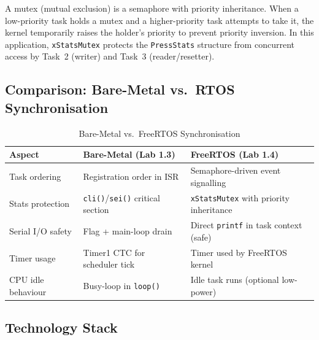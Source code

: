 \documentclass[12pt]{article}
\begin{document}
A mutex (mutual exclusion) is a semaphore with priority inheritance. When a low-priority task holds a mutex and a higher-priority task attempts to take it, the kernel temporarily raises the holder's priority to prevent priority inversion. In this application, \texttt{xStatsMutex} protects the \texttt{PressStats} structure from concurrent access by Task~2 (writer) and Task~3 (reader/resetter). \cite{freertos_mutex}

\subsection{Comparison: Bare-Metal vs.\ RTOS Synchronisation}

\begin{table}[H]
\centering
\begin{tabular}{@{}p{3.5cm}p{4.8cm}p{4.8cm}@{}}
\toprule
\textbf{Aspect} & \textbf{Bare-Metal (Lab 1.3)} & \textbf{FreeRTOS (Lab 1.4)} \\
\midrule
Task ordering       & Registration order in ISR     & Semaphore-driven event signalling \\
Stats protection    & \texttt{cli()}/\texttt{sei()} critical section & \texttt{xStatsMutex} with priority inheritance \\
Serial I/O safety   & Flag + main-loop drain        & Direct \texttt{printf} in task context (safe) \\
Timer usage         & Timer1 CTC for scheduler tick  & Timer used by FreeRTOS kernel \\
CPU idle behaviour  & Busy-loop in \texttt{loop()}   & Idle task runs (optional low-power) \\
\bottomrule
\end{tabular}
\caption{Bare-Metal vs.\ FreeRTOS Synchronisation}
\label{tab:comparison}
\end{table}

\subsection{Technology Stack}
\end{document}

